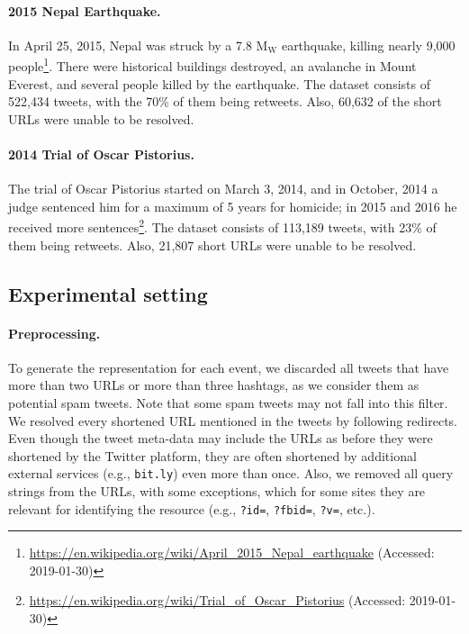 
\paragraph{2015 Nepal Earthquake.} 
%
In April 25, 2015, Nepal was struck by a 7.8 $\text{M}_\text{W}$ earthquake,
killing nearly 9,000
people\footnote{\url{https://en.wikipedia.org/wiki/April_2015_Nepal_earthquake}
(Accessed: 2019-01-30)}. There were historical buildings destroyed, an avalanche
in Mount Everest, and several people killed by the earthquake.
%
The dataset consists of 522,434 tweets, with the 70\% of them being retweets.
%
Also, 60,632 of the short URLs were unable to be resolved.


\paragraph{2014 Trial of Oscar Pistorius.} 
%
The trial of Oscar Pistorius started on March 3, 2014, and in October, 2014 a
judge sentenced him for a maximum of 5 years for homicide; in 2015 and 2016 he
received more
sentences\footnote{\url{https://en.wikipedia.org/wiki/Trial_of_Oscar_Pistorius}
(Accessed: 2019-01-30)}.
% 
The dataset consists of 113,189 tweets, with 23\% of them being retweets.
%
Also, 21,807 short URLs were unable to be resolved.





\subsection{Experimental setting}

\paragraph{Preprocessing.}
%
To generate the representation for each event, we discarded all tweets that have
more than two URLs or more than three hashtags, as we consider them as potential
spam tweets. 
%
Note that some spam tweets may not fall into this filter.
%
We resolved every shortened URL mentioned in the tweets by following redirects. 
%
Even though the tweet meta-data may include the URLs as before they were
shortened by the Twitter platform, they are often shortened by additional
external services (e.g., {\tt bit.ly}) even more than once.
%
Also, we removed all query strings from the URLs, with some exceptions, which
for some sites they are relevant for identifying the resource (e.g., {\tt ?id=},
{\tt ?fbid=}, {\tt ?v=}, etc.).

